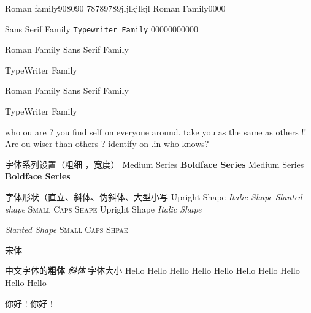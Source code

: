 \documentclass{article}
\begin{document}
	\textrm{Roman family908090} 
	78789789jljlkjlkjl
	\rmfamily Roman Family0000
	
	\textsf{Sans Serif Family} 
	\texttt{Typewriter Family} 
	00000000000
	
	\rmfamily Roman Family {\sffamily Sans Serif Family} 
	
	{\ttfamily TypeWriter Family }
	
	{	\rmfamily Roman Family} {\sffamily Sans Serif Family} 
	
	{\ttfamily TypeWriter Family }
	
	
	
	\sffamily who ou are ? you find self on everyone around. take you as the same as others !! 
	\ttfamily Are ou wiser than others ? identify on .in 
	who knows? 



 字体系列设置（粗细 ，宽度） 
\textmd{Medium Series}  \textbf{Boldface Series } 
{\mdseries Medium Series }  {\bfseries Boldface Series }

字体形状（直立、斜体、伪斜体、大型小写 
\textup{Upright Shape }
\textit{Italic Shape}
\textsl{Slanted shape } \textsc{Small Caps Shape }
{\upshape Upright Shape } {\itshape Italic Shape } 

{\slshape Slanted Shape }
{\scshape Small Caps Shpae }

{\songti 宋体 }

中文字体的\textbf{粗体}
\textit{斜体} 
字体大小 
{\tiny		Hello }
{\scriptsize 		Hello }
{\footnotesize 		Hello }
{\small		Hello }
{\normalsize 		Hello }
{\large 		Hello }
{\Large		Hello }
{\LARGE 		Hello }
{\huge		Hello }
{\Huge		Hello }

 你好  !   
 你好  ! 
\end{document}
